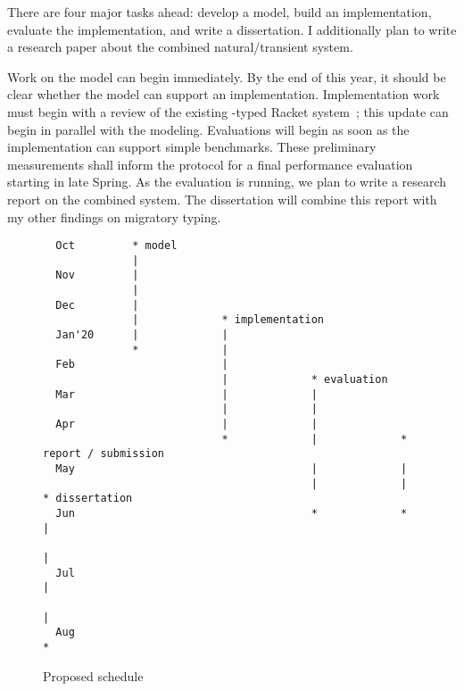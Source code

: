 There are four major tasks ahead:
  develop a model,
  build an implementation,
  evaluate the implementation,
  and write a dissertation.
I additionally plan to write a research paper about the combined
 natural/transient system.

Work on the model can begin immediately.
By the end of this year, it should be clear whether the model can support
 an implementation.
Implementation work must begin with a review of the existing
 \tshallow{}-typed Racket system~\cite{gf-icfp-2018};
 this update can begin in parallel with the modeling.
Evaluations will begin as soon as the implementation can support simple
 benchmarks.
These preliminary measurements shall inform the protocol for a final
 performance evaluation starting in late Spring.
As the evaluation is running, we plan to write a research report on the
 combined system.
The dissertation will combine this report with my other findings on
 migratory typing.

\begin{figure}[t]
\begin{verbatim}
  Oct         * model
              |
  Nov         |
              |
  Dec         |
              |             * implementation
  Jan'20      |             |
              *             |
  Feb                       |
                            |             * evaluation
  Mar                       |             |
                            |             |
  Apr                       |             |
                            *             |             * report / submission
  May                                     |             |
                                          |             |             * dissertation
  Jun                                     *             *             |
                                                                      |
  Jul                                                                 |
                                                                      |
  Aug                                                                 *

\end{verbatim}
  \caption{Proposed schedule}
  \label{fig:schedule}
\end{figure}

